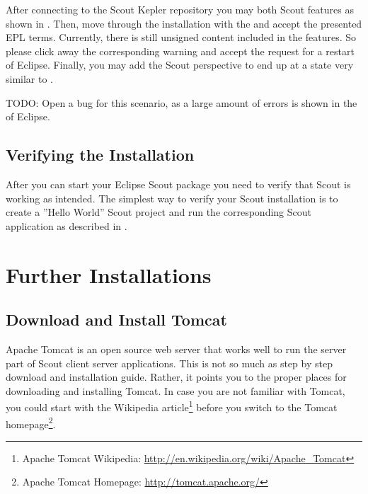 \documentclass[a4paper,10pt,twoside]{book}
\begin{document}
After connecting to the Scout Kepler repository you may both Scout features as shown in .
Then, move through the installation with the  and accept the presented EPL terms.
Currently, there is still unsigned content included in the features.
So please click away the corresponding warning and accept the request for a restart of Eclipse.
Finally, you may add the Scout perspective to end up at a state very similar to .

TODO: Open a bug for this scenario, as a large amount of errors is shown in the  of Eclipse.


\section{Verifying the Installation}

After you can start your Eclipse Scout package you need to verify that Scout is working as intended.
The simplest way to verify your Scout installation is to create a ''Hello World'' Scout project and run the corresponding Scout application as described in .

\chapter{Further Installations}

\section{Download and Install Tomcat}

Apache Tomcat is an open source web server that works well to run the server part of Scout client server applications.
This is not so much as step by step download and installation guide. 
Rather, it points you to the proper places for downloading and installing Tomcat.
In case you are not familiar with Tomcat, you could start with the Wikipedia article\footnote{
Apache Tomcat Wikipedia: \url{http://en.wikipedia.org/wiki/Apache_Tomcat}
}
before you switch to the Tomcat homepage\footnote{
Apache Tomcat Homepage: \url{http://tomcat.apache.org/}
}.
\end{document}
